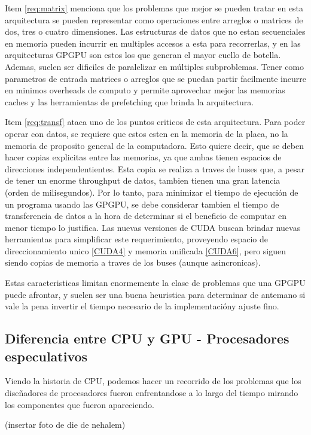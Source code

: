 Item \ref{req:matrix} menciona que los problemas que mejor se pueden tratar en esta
arquitectura se pueden representar como operaciones entre arreglos o matrices de
dos, tres o cuatro dimensiones. Las estructuras de datos que no estan secuenciales
en memoria pueden incurrir en multiples accesos a esta para recorrerlas, y en las
arquitecturas GPGPU son estos los que generan el mayor cuello de botella. Ademas,
suelen ser dificiles de paralelizar en m\'ultiples subproblemas. Tener como parametros de
entrada matrices o arreglos que se puedan partir facilmente incurre en minimos
overheads de computo y permite aprovechar mejor las memorias caches y las herramientas de
prefetching que brinda la arquitectura.

Item \ref{req:transf} ataca uno de los puntos criticos de esta arquitectura. Para poder
operar con datos, se requiere que estos esten en la memoria de la placa, no la memoria
de proposito general de la computadora. Esto quiere decir, que se deben hacer copias
explicitas entre las memorias, ya que ambas tienen espacios de direcciones independentientes.
Esta copia se realiza a traves de buses que, a pesar de tener un enorme throughput de
datos, tambien tienen una gran latencia (orden de milisegundos). Por lo tanto, para minimizar
el tiempo de ejecuci\'on de un programa usando las GPGPU, se debe considerar tambien el
tiempo de transferencia de datos a la hora de determinar si el beneficio de computar en
menor tiempo lo justifica. Las nuevas versiones de CUDA buscan brindar nuevas herramientas
para simplificar este requerimiento, proveyendo espacio de direccionamiento unico \ref{CUDA4} y
memoria unificada \ref{CUDA6}, pero siguen siendo copias de memoria a traves de los
buses (aunque asincronicas).

Estas caracteristicas limitan enormemente la clase de problemas que una GPGPU puede
afrontar, y suelen ser una buena heuristica para determinar de antemano si vale la pena
invertir el tiempo necesario de la implementaci\'ony ajuste fino.


\subsection{Diferencia entre CPU y GPU - Procesadores especulativos}
Viendo la historia de CPU, podemos hacer un recorrido de los problemas que los dise\~nadores de procesadores
fueron enfrentandose a lo largo del tiempo mirando los componentes que fueron apareciendo.

(insertar foto de die de nehalem)

